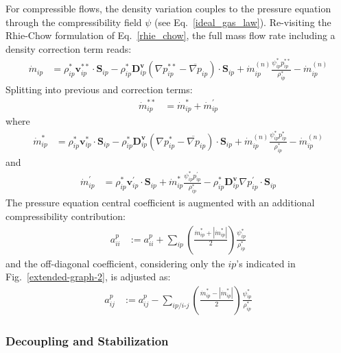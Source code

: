 \documentclass[12pt]{extarticle}
\newcommand{\<}{\langle}
\renewcommand{\>}{\rangle}
\theoremstyle{definition}
\begin{document}
For compressible flows, the density variation couples to the pressure equation through the compressibility field $\psi$ (see Eq.~\ref{ideal_gas_law}). Re-visiting the Rhie-Chow formulation of Eq.~\ref{rhie_chow}, the full mass flow rate including a density correction term reads:
\begin{align}
    \dot{m}_{ip} &= \rho^{*}_{ip} \textbf{v}^{**}_{ip} \cdot \textbf{S}_{ip} - \rho^{*}_{ip} \textbf{D}^{\textbf{v}}_{ip} \left ( \nabla p^{**}_{ip} - \overline{\nabla p}_{ip} \right) \cdot \textbf{S}_{ip} + \dot{m}^{(n)}_{ip}\frac{\psi^{*}_{ip} p^{**}_{ip}}{\rho^{*}_{ip}} - \dot{m}^{(n)}_{ip}
\end{align}
Splitting into previous and correction terms:
\begin{align}
    \dot{m}^{**}_{ip} &= \dot{m}^{*}_{ip} + \dot{m}^{\prime}_{ip}
\end{align}
where
\begin{align}
    \dot{m}^{*}_{ip} &= \rho^{*}_{ip} \textbf{v}^{*}_{ip} \cdot \textbf{S}_{ip} - \rho^{*}_{ip}\textbf{D}^{\textbf{v}}_{ip} \left ( \nabla p^{*}_{ip} - \overline{\nabla p}_{ip} \right) \cdot \textbf{S}_{ip} + \dot{m}^{(n)}_{ip}\frac{\psi^{*}_{ip} p^{*}_{ip}}{\rho^{*}_{ip}} - \dot{m}^{(n)}_{ip}
\end{align}
and
\begin{align}
    \dot{m}^{\prime}_{ip} &= \rho^{*}_{ip} \textbf{v}^{\prime}_{ip}  \cdot \textbf{S}_{ip} + \dot{m}^{*}_{ip}\frac{\psi^{*}_{ip} p^{\prime}_{ip}}{\rho^{*}_{ip}} - \rho^{*}_{ip} \textbf{D}^{\textbf{v}}_{ip} \nabla p^{\prime}_{ip} \cdot \textbf{S}_{ip}
\end{align}
The pressure equation central coefficient is augmented with an additional compressibility contribution:
\begin{align}
    a_{ii}^{p} &:= a_{ii}^{p} + \sum_{ip}\left(\frac{\dot{m}_{ip}^* + |\dot{m}_{ip}^*|}{2}\right) \frac{\psi^{*}_{ip}}{\rho^{*}_{ip}}
\end{align}
and the off-diagonal coefficient, considering only the $ip$'s indicated in Fig.~\ref{extended-graph-2}, is adjusted as:
\begin{align}
    a_{ij}^{p} &:= a_{ij}^{p} - \sum_{ip/i\text{-}j}\left(\frac{\dot{m}_{ip}^* - |\dot{m}_{ip}^*|}{2}\right) \frac{\psi^{*}_{ip}}{\rho^{*}_{ip}}
\end{align}

\subsubsection{Decoupling and Stabilization}
\end{document}
